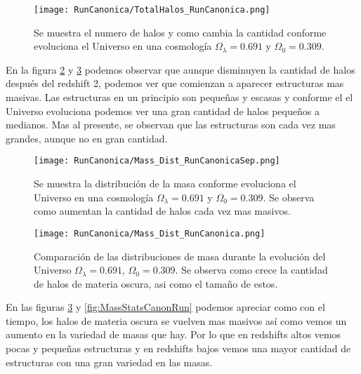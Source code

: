 \begin{figure}[ht!]
    \centering
    \texttt{[image: RunCanonica/TotalHalos\_RunCanonica.png]}
    \caption[Evolución del número de halos en un Universo $\Omega_\lambda = 0.691 $, $\Omega_0 = 0.309$]{\footnotesize Se muestra el numero de halos y como cambia la cantidad conforme evoluciona el Universo en una cosmología $\Omega_\lambda = 0.691 $ y $\Omega_0 = 0.309$.}
    \label{fig:EvoNumTotHalos}
\end{figure}

En la figura \ref{fig:MassDistCanonRunSep} y \ref{fig:MassDistCanonRun} podemos observar que aunque disminuyen la cantidad de halos después del redshift 2, podemos ver que comienzan a aparecer estructuras mas masivas. Las estructuras en un principio son pequeñas y escasas y conforme el el Universo evoluciona podemos ver una gran cantidad de halos pequeños a medianos. Mas al presente, se observan que las estructuras son cada vez mas grandes, aunque no en gran cantidad.

\begin{figure}[ht!]
    \centering
    \texttt{[image: RunCanonica/Mass\_Dist\_RunCanonicaSep.png]}
    \caption[Distribución de masa en la evolución de un Universo $\Omega_\lambda = 0.691 $, $\Omega_0 = 0.309$]{\footnotesize Se muestra la distribución de la masa conforme evoluciona el Universo en una cosmología $\Omega_\lambda = 0.691 $ y $\Omega_0 = 0.309$. Se observa como aumentan la cantidad de halos cada vez mas masivos.}
    \label{fig:MassDistCanonRunSep}
\end{figure}

\begin{figure}[ht!]
    \centering
    \texttt{[image: RunCanonica/Mass\_Dist\_RunCanonica.png]}
    \caption[Comparación de distribución de masa Universo $\Omega_\lambda = 0.691 $, $\Omega_0 = 0.309$]{\footnotesize Comparación de las distribuciones de masa durante la evolución del Universo $\Omega_\lambda = 0.691 $, $\Omega_0 = 0.309$. Se observa como crece la cantidad de halos de materia oscura, asi como el tamaño de estos.}
    \label{fig:MassDistCanonRun}
\end{figure}

En las figuras \ref{fig:MassDistCanonRun} y \ref{fig:MassStatsCanonRun} podemos apreciar como con el tiempo, los halos de materia oscura se vuelven mas masivos así como vemos un aumento en la variedad de masas que hay. Por lo que en redshifts altos vemos pocas y pequeñas estructuras y en redshifts bajos vemos una mayor cantidad de estructuras con una gran variedad en las masas.

